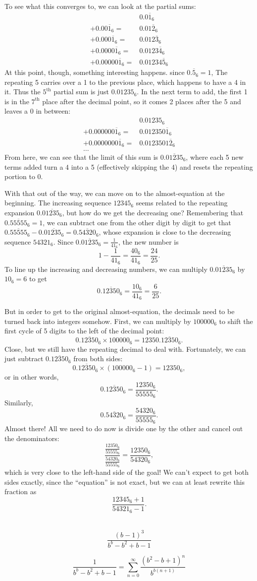 \documentclass{article}
\begin{document}
To see what this converges to, we can look at the partial sums:
\begin{align*}
  & 0.0\overline{1}_6 \\
  + 0.00\overline{1}_6 =& 0.01\overline{2}_6 \\
  + 0.000\overline{1}_6 =& 0.012\overline{3}_6 \\
  + 0.0000\overline{1}_6 =& 0.0123\overline{4}_6 \\
  + 0.00000\overline{1}_6 =& 0.01234\overline{5}_6
\end{align*}
At this point, though, something interesting happens.
since $0.\overline{5}_6=1$,
The repeating 5 carries over a 1 to the previous place,
which happens to have a 4 in it.
Thus the $5^\text{th}$ partial sum is just $0.01235_6$.
In the next term to add,
the first 1 is in the $7^\text{th}$ place after the decimal point,
so it comes 2 places after the 5 and leaves a 0 in between:
\begin{align*}
  & 0.01235_6 \\
  + 0.000000\overline{1}_6 =& 0.012350\overline{1}_6 \\
  + 0.0000000\overline{1}_6 =& 0.0123501\overline{2}_6 \\
  \ldots &
\end{align*}
From here, we can see that the limit of this sum is
$0.\overline{01235}_6$,
where each 5 new terms added turn a 4 into a 5
(effectively skipping the 4)
and resets the repeating portion to 0.

With that out of the way, we can move on to the almost-equation at the beginning.
The increasing sequence $12345_6$ seems related to the repeating expansion $0.\overline{01235_6}$,
but how do we get the decreasing one?
Remembering that $0.\overline{55555}_6=1$,
we can subtract one from the other digit by digit
to get that $0.\overline{55555}_6-0.\overline{01235_6}=0.\overline{54320}_6$,
whose expansion is close to the decreasing sequence $54321_6$.
Since $0.\overline{01235}_6=\frac{1}{41_6}$,
the new number is
\[1-\frac{1}{41_6}=\frac{40_6}{41_6}=\frac{24}{25}.\]
To line up the increasing and decreasing numbers,
we can multiply $0.\overline{01235}_6$ by $10_6=6$
to get
\[0.\overline{12350}_6 = \frac{10_6}{41_6} = \frac{6}{25}.\]

But in order to get to the original almost-equation,
the decimals need to be turned back into integers somehow.
First, we can multiply by $100000_6$
to shift the first cycle of 5 digits to the left of the decimal point:
\[0.\overline{12350}_6 \times 100000_6 = 12350.\overline{12350}_6.\]
Close, but we still have the repeating decimal to deal with.
Fortunately, we can just subtract $0.\overline{12350}_6$ from both sides:
\[0.\overline{12350}_6 \times (100000_6-1) = 12350_6,\]
or in other words,
\[0.\overline{12350}_6 = \frac{12350_6}{55555_6}.\]
Similarly,
\[0.\overline{54320}_6 = \frac{54320_6}{55555_6}.\]
Almost there! All we need to do now is divide one by the other
and cancel out the denominators:
\[\frac{\frac{12350_6}{55555_6}}{\frac{54320_6}{55555_6}}
=\frac{12350_6}{54320_6},\]
which is very close to the left-hand side of the goal!
We can't expect to get both sides exactly,
since the ``equation'' is not exact,
but we can at least rewrite this fraction as
\[\frac{12345_6+1}{54321_6-1}.\]

\begin{align*}
\end{align*}


\[\frac{(b-1)^3}{b^b-b^2+b-1}\]

\[\frac{1}{b^b-b^2+b-1} = \sum_{n=0}^\infty \frac{(b^2-b+1)^n}{b^{b(n+1)}} \]
\end{document}
